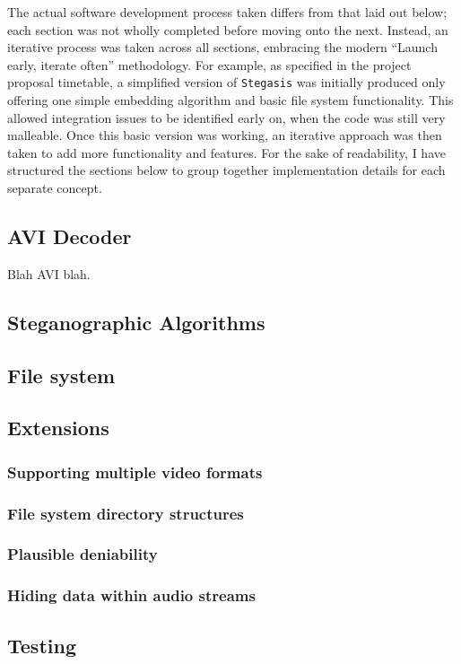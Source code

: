 \documentclass[paper=a4, fontsize=11pt,twoside]{scrartcl}    %
\numberwithin{table}{section}
\numberwithin{figure}{section}
\begin{document}
The actual software development process taken differs from that laid out below; each section was not wholly completed before moving onto the next. Instead, an iterative process was taken across all sections, embracing the modern ``Launch early, iterate often'' methodology. For example, as specified in the project proposal timetable, a simplified version of \texttt{Stegasis} was initially produced only offering one simple embedding algorithm and basic file system functionality. This allowed integration issues to be identified early on, when the code was still very malleable. Once this basic version was working, an iterative approach was then taken to add more functionality and features. For the sake of readability, I have structured the sections below to group together implementation details for each separate concept.

\subsection{AVI Decoder}

Blah AVI blah.

\vfill
\subsection{Steganographic Algorithms}
\subsection{File system}
\subsection{Extensions}
\subsubsection{Supporting multiple video formats}
\label{extffmpeg}
\subsubsection{File system directory structures}
\subsubsection{Plausible deniability}
\subsubsection{Hiding data within audio streams}
\subsection{Testing}
\end{document}
